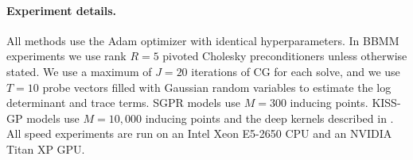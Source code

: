 \paragraph{Experiment details.}
All methods use the Adam optimizer \cite{kingma2014adam} with identical hyperparameters.
In BBMM experiments we use rank $R\!=\!5$ pivoted Cholesky preconditioners unless otherwise stated.
We use a maximum of $J\!=\!20$ iterations of CG for each solve, and
we use $T\!=\!10$ probe vectors filled with Gaussian random variables to estimate the log determinant and trace terms.
SGPR models use $M\!=\!300$ inducing points.
KISS-GP models use $M\!=\!10,\!000$ inducing points and the deep kernels described in \cite{wilson2016deep}.
All speed experiments are run on an Intel Xeon E5-2650 CPU and an NVIDIA Titan XP GPU.

